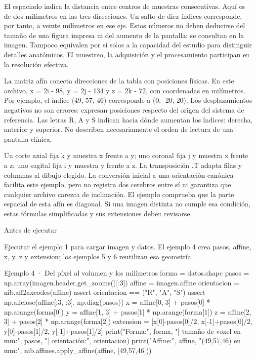 El espaciado indica la distancia entre centros de muestras consecutivas. Aquí es de dos milímetros en las tres direcciones. Un salto de diez índices corresponde, por tanto, a veinte milímetros en ese eje. Estos números no deben deducirse del tamaño de una figura impresa ni del aumento de la pantalla: se consultan en la imagen. Tampoco equivalen por sí solos a la capacidad del estudio para distinguir detalles anatómicos. El muestreo, la adquisición y el procesamiento participan en la resolución efectiva.


La matriz afín conecta direcciones de la tabla con posiciones físicas. En este archivo, x = 2i - 98, y = 2j - 134 y z = 2k - 72, con coordenadas en milímetros. Por ejemplo, el índice (49, 57, 46) corresponde a (0, -20, 20). Los desplazamientos negativos no son errores: expresan posiciones respecto del origen del sistema de referencia. Las letras R, A y S indican hacia dónde aumentan los índices: derecha, anterior y superior. No describen necesariamente el orden de lectura de una pantalla clínica.


Un corte axial fija k y muestra x frente a y; uno coronal fija j y muestra x frente a z; uno sagital fija i y muestra y frente a z. La transposición .T adapta filas y columnas al dibujo elegido. La conversión inicial a una orientación canónica facilita este ejemplo, pero no registra dos cerebros entre sí ni garantiza que cualquier archivo carezca de inclinación. El ejemplo comprueba que la parte espacial de esta afín es diagonal. Si una imagen distinta no cumple esa condición, estas fórmulas simplificadas y sus extensiones deben revisarse.



\begin{Idea}{Antes de ejecutar}

Ejecutar el ejemplo 1 para cargar imagen y datos. El ejemplo 4 crea pasos, affine, x, y, z y extension; los ejemplos 5 y 6 reutilizan esa geometría.


\end{Idea}

\begin{Codigo}{Ejemplo 4 · Del píxel al volumen y los milímetros}
forma = datos.shape
pasos = np.array(imagen.header.get_zooms()[:3])
affine = imagen.affine
orientacion = nib.aff2axcodes(affine)
assert orientacion == ("R", "A", "S")
assert np.allclose(affine[:3, :3], np.diag(pasos))
x = affine[0, 3] + pasos[0] * np.arange(forma[0])
y = affine[1, 3] + pasos[1] * np.arange(forma[1])
z = affine[2, 3] + pasos[2] * np.arange(forma[2])
extension = [x[0]-pasos[0]/2, x[-1]+pasos[0]/2, y[0]-pasos[1]/2, y[-1]+pasos[1]/2]
print("Forma:", forma, "| tamaño de voxel en mm:", pasos, "| orientación:", orientacion)
print("Affine:\n", affine, " (49,57,46) en mm:", nib.affines.apply_affine(affine, [49,57,46]))
\end{Codigo}

